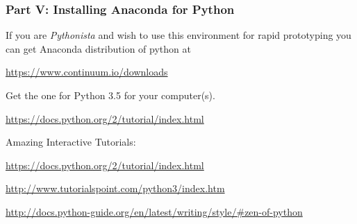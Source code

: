 \documentclass[pdftex,letterpaper,12pt]{article}
\newcommand{\<}{\langle}
\renewcommand{\>}{\rangle}
\begin{document}
\subsubsection{Part V: Installing Anaconda for Python}

If you are {\em Pythonista} and wish to use this  environment
for rapid prototyping you can get  Anaconda distribution of python at 

\href{https://www.continuum.io/downloads}{https://www.continuum.io/downloads}

Get the one for Python 3.5 for your computer(s).


\href{https://docs.python.org/2/tutorial/index.html}{https://docs.python.org/2/tutorial/index.html}


Amazing Interactive Tutorials:

\href{https://docs.python.org/2/tutorial/index.html}{https://docs.python.org/2/tutorial/index.html}

\href{http://www.tutorialspoint.com/python3/index.htm}{http://www.tutorialspoint.com/python3/index.htm}

\href{http://docs.python-guide.org/en/latest/writing/style/\#zen-of-python}{http://docs.python-guide.org/en/latest/writing/style/\#zen-of-python}
\end{document}
